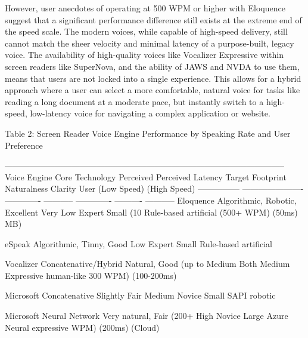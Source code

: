 However, user anecdotes of operating at 500 WPM or higher with Eloquence
suggest that a significant performance difference still exists at the
extreme end of the speed scale.\supercite{15} The modern voices, while capable of
high-speed delivery, still cannot match the sheer velocity and minimal
latency of a purpose-built, legacy voice. The availability of
high-quality voices like Vocalizer Expressive within screen readers like
SuperNova, and the ability of JAWS and NVDA to use them, means that
users are not locked into a single experience.\supercite{10} This allows for a
hybrid approach where a user can select a more comfortable, natural
voice for tasks like reading a long document at a moderate pace, but
instantly switch to a high-speed, low-latency voice for navigating a
complex application or website.

Table 2: Screen Reader Voice Engine Performance by Speaking Rate and
User Preference

  -----------------------------------------------------------------------------------------------------
  Voice Engine    Core Technology        Perceived     Perceived   Latency       Target     Footprint
                                         Naturalness   Clarity                   User       
                                         (Low Speed)   (High                                
                                                       Speed)                               
  --------------- ---------------------- ------------- ----------- ------------- ---------- -----------
  Eloquence   Algorithmic,           Robotic,      Excellent   Very Low      Expert     Small (10
                  Rule-based             artificial    (500+ WPM)  (\<50ms)                 MB)

  eSpeak      Algorithmic,           Tinny,        Good        Low           Expert     Small
                  Rule-based             artificial                                         

  Vocalizer     Concatenative/Hybrid   Natural,      Good (up to Medium        Both       Medium
  Expressive                           human-like    300 WPM)    (100-200ms)              

  Microsoft     Concatenative          Slightly      Fair        Medium        Novice     Small
  SAPI                                 robotic                                            

  Microsoft     Neural Network         Very natural, Fair (200+  High          Novice     Large
  Azure Neural                         expressive    WPM)        (\>200ms)                (Cloud)

